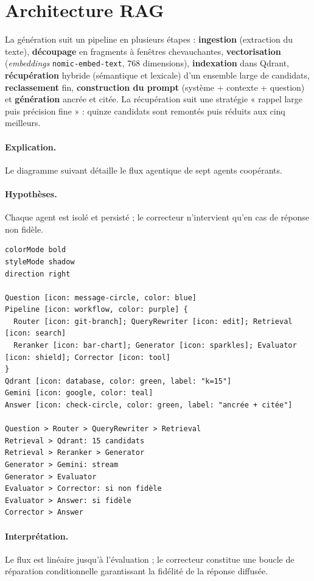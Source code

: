 \section{Architecture RAG}
La génération suit un pipeline en plusieurs étapes : \textbf{ingestion} (extraction
du texte), \textbf{découpage} en fragments à fenêtres chevauchantes,
\textbf{vectorisation} (\emph{embeddings} \texttt{nomic-embed-text}, 768
dimensions), \textbf{indexation} dans Qdrant, \textbf{récupération} hybride
(sémantique et lexicale) d'un ensemble large de candidats, \textbf{reclassement}
fin, \textbf{construction du prompt} (système + contexte + question) et
\textbf{génération} ancrée et citée. La récupération suit une stratégie « rappel
large puis précision fine » : quinze candidats sont remontés puis réduits aux cinq
meilleurs.

\paragraph{Explication.} Le diagramme suivant détaille le flux agentique de sept
agents coopérants.
\paragraph{Hypothèses.} Chaque agent est isolé et persisté ; le correcteur
n'intervient qu'en cas de réponse non fidèle.

\begin{lstlisting}[style=eraser,caption={Pipeline agentique RAG (Eraser)},label={lst:pipe}]
colorMode bold
styleMode shadow
direction right

Question [icon: message-circle, color: blue]
Pipeline [icon: workflow, color: purple] {
  Router [icon: git-branch]; QueryRewriter [icon: edit]; Retrieval [icon: search]
  Reranker [icon: bar-chart]; Generator [icon: sparkles]; Evaluator [icon: shield]; Corrector [icon: tool]
}
Qdrant [icon: database, color: green, label: "k=15"]
Gemini [icon: google, color: teal]
Answer [icon: check-circle, color: green, label: "ancrée + citée"]

Question > Router > QueryRewriter > Retrieval
Retrieval > Qdrant: 15 candidats
Retrieval > Reranker > Generator
Generator > Gemini: stream
Generator > Evaluator
Evaluator > Corrector: si non fidèle
Evaluator > Answer: si fidèle
Corrector > Answer
\end{lstlisting}

\paragraph{Interprétation.} Le flux est linéaire jusqu'à l'évaluation ; le
correcteur constitue une boucle de réparation conditionnelle garantissant la
fidélité de la réponse diffusée.

